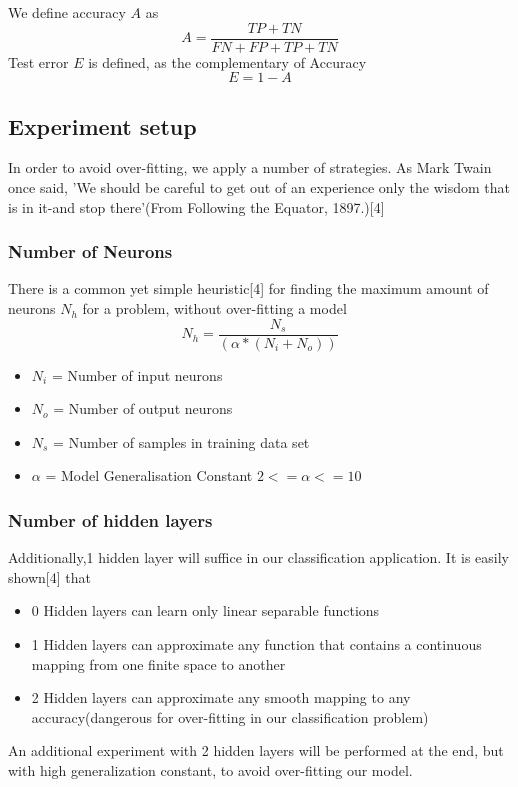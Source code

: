 \documentclass{proc}
\begin{document}
	We define accuracy $A$ as
	\[
		A={\frac {TP+TN}{FN+FP+TP+TN}}
	\]
	Test error $E$ is defined, as the complementary of Accuracy
	\[
		E = 1-A
	\]
	\subsection{Experiment setup}
	In order to avoid over-fitting, we apply a number of strategies. As Mark Twain once said, 'We should be careful to get out of an experience only the wisdom that is in it-and stop there'(From Following the Equator, 1897.)[4]
	\subsubsection{Number of Neurons}
	There is a common yet simple heuristic[4] for finding the maximum amount of neurons ${N_h}$ for a problem, without over-fitting a model
	\[
		N_h = \frac{N_s} {(\alpha * (N_i + N_o))}	
	\]
	\begin{itemize}
		\item $N_i$ = Number of input neurons
		\item $N_o$	= Number of output neurons
		\item $N_s$ = Number of samples in training data set
		\item $\alpha$ =   Model Generalisation Constant ${2<=\alpha<=10}$
	\end{itemize} 
	\subsubsection{Number of hidden layers}
	Additionally,1 hidden layer will suffice in our classification application. It is easily shown[4] that 
	
	\begin{itemize}
		\item 0 Hidden layers can learn only linear separable functions
		\item 1 Hidden layers can approximate any function that contains a continuous mapping from one finite space to another
		\item 2 Hidden layers can approximate any smooth mapping to any accuracy(dangerous for over-fitting in our classification problem)
	\end{itemize} 
	
	An additional experiment with 2 hidden layers will be performed at the end, but with high generalization constant, to avoid over-fitting our model.
	
\end{document}
